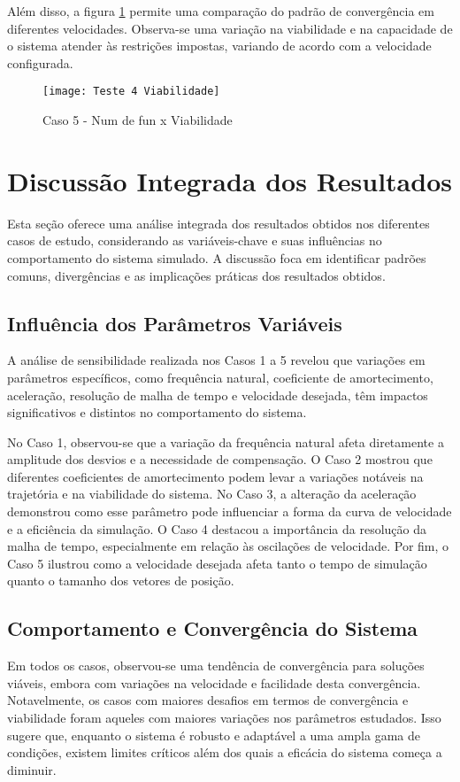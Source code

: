 Além disso, a figura \ref{fig:t_4_viab} permite uma comparação do padrão de convergência em diferentes velocidades. Observa-se uma variação na viabilidade e na capacidade de o sistema atender às restrições impostas, variando de acordo com a velocidade configurada.

\begin{figure}[H]
    \begin{center}
    \caption{Caso 5 - Num de fun x Viabilidade}
    \texttt{[image: Teste 4 Viabilidade]}
    \label{fig:t_4_viab}
    \end{center}
\end{figure}

\section{Discussão Integrada dos Resultados}
Esta seção oferece uma análise integrada dos resultados obtidos nos diferentes casos de estudo, considerando as variáveis-chave e suas influências no comportamento do sistema simulado. A discussão foca em identificar padrões comuns, divergências e as implicações práticas dos resultados obtidos.

\subsection{Influência dos Parâmetros Variáveis}
A análise de sensibilidade realizada nos Casos 1 a 5 revelou que variações em parâmetros específicos, como frequência natural, coeficiente de amortecimento, aceleração, resolução de malha de tempo e velocidade desejada, têm impactos significativos e distintos no comportamento do sistema. 

No Caso 1, observou-se que a variação da frequência natural afeta diretamente a amplitude dos desvios e a necessidade de compensação. O Caso 2 mostrou que diferentes coeficientes de amortecimento podem levar a variações notáveis na trajetória e na viabilidade do sistema. No Caso 3, a alteração da aceleração demonstrou como esse parâmetro pode influenciar a forma da curva de velocidade e a eficiência da simulação. O Caso 4 destacou a importância da resolução da malha de tempo, especialmente em relação às oscilações de velocidade. Por fim, o Caso 5 ilustrou como a velocidade desejada afeta tanto o tempo de simulação quanto o tamanho dos vetores de posição.

\subsection{Comportamento e Convergência do Sistema}
Em todos os casos, observou-se uma tendência de convergência para soluções viáveis, embora com variações na velocidade e facilidade desta convergência. Notavelmente, os casos com maiores desafios em termos de convergência e viabilidade foram aqueles com maiores variações nos parâmetros estudados. Isso sugere que, enquanto o sistema é robusto e adaptável a uma ampla gama de condições, existem limites críticos além dos quais a eficácia do sistema começa a diminuir.

